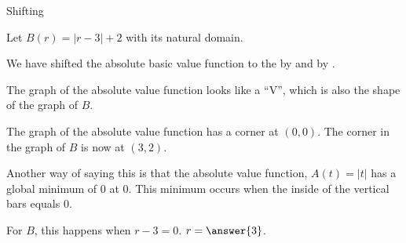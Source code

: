 \documentclass{ximera}
\begin{document}
\begin{example}  Shifting

Let $B(r) = |r-3| + 2$ with its natural domain.  


We have shifted the absolute basic value function to the  by  and   by .


\begin{image}
\end{image}




The graph of the absolute value function looks like a ``V'', which is also the shape of the graph of $B$. 


The graph of the absolute value function has a corner at $(0, 0)$.  The corner in the graph of $B$ is now at $(3, 2)$. 

Another way of saying this is that the absolute value function, $A(t) = |t|$ has a global minimum of $0$ at $0$.  This minimum occurs when the inside of the vertical bars equals $0$.

For $B$, this happens when $r-3=0$. $r=\answer{3}$.



\end{example}
\end{document}
